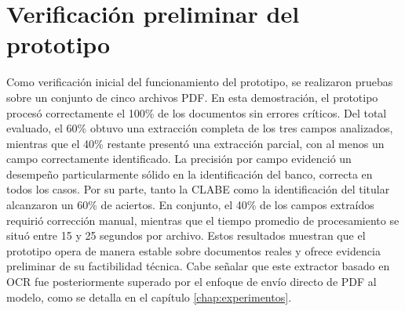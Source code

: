 \section{Verificación preliminar del prototipo}

Como verificación inicial del funcionamiento del prototipo, se realizaron pruebas sobre un conjunto de cinco archivos PDF. En esta demostración, el prototipo procesó correctamente el 100\% de los documentos sin errores críticos. Del total evaluado, el 60\% obtuvo una extracción completa de los tres campos analizados, mientras que el 40\% restante presentó una extracción parcial, con al menos un campo correctamente identificado. La precisión por campo evidenció un desempeño particularmente sólido en la identificación del banco, correcta en todos los casos. Por su parte, tanto la CLABE como la identificación del titular alcanzaron un 60\% de aciertos. En conjunto, el 40\% de los campos extraídos requirió corrección manual, mientras que el tiempo promedio de procesamiento se situó entre 15 y 25 segundos por archivo. Estos resultados muestran que el prototipo opera de manera estable sobre documentos reales y ofrece evidencia preliminar de su factibilidad técnica. Cabe señalar que este extractor basado en OCR fue posteriormente superado por el enfoque de envío directo de PDF al modelo, como se detalla en el capítulo \ref{chap:experimentos}.
